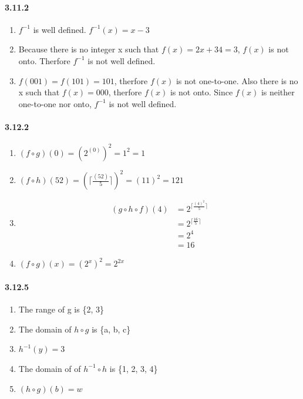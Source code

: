 \documentclass[11pt, letterpaper, twocolumn, fleqn]{article}
\begin{document}
    \paragraph{3.11.2}
    \renewcommand{\labelenumi}{\alph{enumi}.}
    \begin{enumerate}
        \item $f^{-1}$ is well defined. $f^{-1}(x)=x-3$
        \item Because there is no integer x such that $f(x)=2x+34=3$, $f(x)$ is not onto. Therfore $f^{-1}$ is not well defined.
        \addtocounter{enumi}{3}
        \item $f(001)=f(101)=101$, therfore $f(x)$ is not one-to-one. Also there is no x such that $f(x)=000$, therfore $f(x)$ is not onto. Since $f(x)$ is neither one-to-one nor onto, $f^{-1}$ is not well defined.
    \end{enumerate}
    
    \paragraph{3.12.2}
    \renewcommand{\labelenumi}{\alph{enumi}.}
    \begin{enumerate}
        \item $(f \circ g)(0)=(2^{(0)})^2=1^2=1$ 
        \item $(f \circ h)(52)=(\lceil \frac{(52)}{5} \rceil)^2 = (11)^2 = 121$
        \item 
            \begin{align*}
                (g \circ h \circ f)(4) &= 2^{\lceil \frac{(4)^2}{5} \rceil} \\
                                       &= 2^{\lceil \frac{16}{5} \rceil} \\
                                       &= 2^{4} \\
                                       &= 16
            \end{align*}
        \addtocounter{enumi}{1}
        \item $(f \circ g)(x)=(2^x)^2 = 2^{2x}$
    \end{enumerate}
    
    \paragraph{3.12.5}
    \renewcommand{\labelenumi}{\alph{enumi}.}
    \begin{enumerate}
        \item The range of g is \{2, 3\}
        \item The domain of $h \circ g$ is \{a, b, c\}
        \item $h^{-1}(y) = 3$
        \item The domain of of $h^{-1} \circ h$ is \{1, 2, 3, 4\}
        \item $(h \circ g)(b)=w$
    \end{enumerate}
\end{document}
